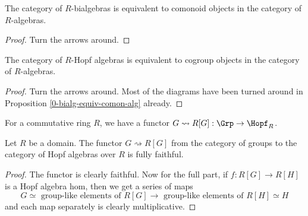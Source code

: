 \begin{proposition}
  \label{0-bialg-equiv-comon-alg}
  \uses{}
  \leanok

  The category of $R$-bialgebras is equivalent to comonoid objects in the category of $R$-algebras.
\end{proposition}
\begin{proof}
  \uses{}
  \leanok

  Turn the arrows around.
\end{proof}


\begin{proposition}
  \label{0-hopf-alg-equiv-cogrp-alg}
  \uses{}
  \leanok

  The category of $R$-Hopf algebras is equivalent to cogroup objects in the category of $R$-algebras.
\end{proposition}
\begin{proof}
  \leanok

  Turn the arrows around.
  Most of the diagrams have been turned around in Proposition \ref{0-bialg-equiv-comon-alg} already.
\end{proof}


\begin{definition}
  \label{0-grp-alg}
  \uses{}
  \leanok

  For a commutative ring $R$, we have a functor $G \rightsquigarrow R[G] : \Grp \to \Hopf_R$.
\end{definition}


\begin{proposition}
  \label{0-full-faithful-grp-alg}
  \leanok

  Let $R$ be a domain.
  The functor $G \rightsquigarrow R[G]$ from the category of groups to the category of Hopf algebras over $R$ is fully faithful.
\end{proposition}
\begin{proof}
  \leanok

  The functor is clearly faithful.
  Now for the full part, if $f : R[G] \to R[H]$ is a Hopf algebra hom, then we get a series of maps
  \[
    G \simeq \text{ group-like elements of } R[G] \to \text{ group-like elements of } R[H] \simeq H
  \]
  and each map separately is clearly multiplicative.
\end{proof}

